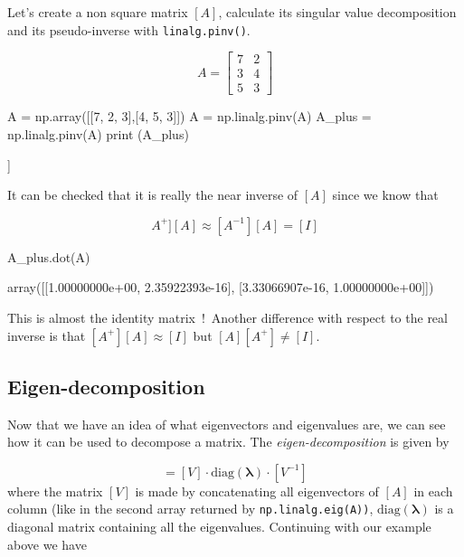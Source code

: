 
Let's create a non square matrix $[A]$, calculate its singular value decomposition and its pseudo-inverse with \texttt{linalg.pinv()}.

\begin{equation*}
A=\begin{bmatrix}
7&2\\
3&4\\
5&3
\end{bmatrix}
\end{equation*}

\begin{ipython}
A = np.array([[7, 2, 3],[4, 5, 3]])
A = np.linalg.pinv(A)
A_plus = np.linalg.pinv(A)
print (A_plus)
\end{ipython}
\begin{ioutput}
[[ 0.16666667 -0.10606061  0.03030303]
 [-0.16666667  0.28787879  0.06060606]]
\end{ioutput}
It can be checked that it is really the near inverse of $[A]$ since we know that

\begin{equation*}
A^{+}][A]\approx[A^{−1}][A]=[I]
\end{equation*}

\begin{ipython}
A_plus.dot(A)
\end{ipython}
\begin{ioutput}
array([[1.00000000e+00, 2.35922393e-16],
       [3.33066907e-16, 1.00000000e+00]])
\end{ioutput}
This is almost the identity matrix~!~Another difference with respect to the real inverse is that $[A^+][A]≈[I]$ but $[A][A^+]\neq [I]$.

\subsection{Eigen-decomposition}
\label{concatenating-eigenvalues-and-eigenvectors}

Now that we have an idea of what eigenvectors and eigenvalues are, we can see how it can be used to decompose a matrix. 
The \emph{eigen-decomposition} is given by

\begin{equation}
[A]=[V]\cdot \textrm{diag}(\boldsymbol{\lambda})\cdot [V^{−1}]
\end{equation}
where the matrix $[V]$ is made by concatenating all eigenvectors of $[A]$ in each column (like in the second array returned by \texttt{np.linalg.eig(A))}, $\textrm{diag}(\boldsymbol{\lambda})$ is a diagonal matrix containing all the eigenvalues. Continuing with our example above we have

